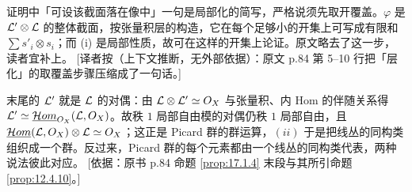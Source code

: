 \begin{yizhu}
证明中「可设该截面落在像中」一句是局部化的简写，严格说须先取开覆盖。$\varphi$ 是 $\mathcal{L}'\otimes\mathcal{L}$ 的整体截面，按张量积层的构造，它在每个足够小的开集上可写成有限和 $\sum s'_i\otimes s_i$；而 (i) 是局部性质，故可在这样的开集上论证。原文略去了这一步，读者宜补上。
[译者按（上下文推断，无外部依据）：原文 p.84 第 5–10 行把「层化」的取覆盖步骤压缩成了一句话。]
\end{yizhu}

\begin{yizhu}
末尾的 $\mathcal{L}'$ 就是 $\mathcal{L}$ 的对偶：由 $\mathcal{L}\otimes\mathcal{L}'\simeq O_X$ 与张量积、内 Hom 的伴随关系得 $\mathcal{L}'\simeq\underline{\mathcal{H}om}_{O_X}(\mathcal{L},O_X)$。故秩 $1$ 局部自由模的对偶仍秩 $1$ 局部自由，且 $\underline{\mathcal{H}om}(\mathcal{L},O_X)\otimes\mathcal{L}\simeq O_X$；这正是 Picard 群的群运算，$(ii)$ 于是把线丛的同构类组织成一个群。反过来，Picard 群的每个元素都由一个线丛的同构类代表，两种说法彼此对应。
[依据：原书 p.84 命题 \ref{prop:17.1.4} 末段与其所引命题 \ref{prop:12.4.10}。]
\end{yizhu}

